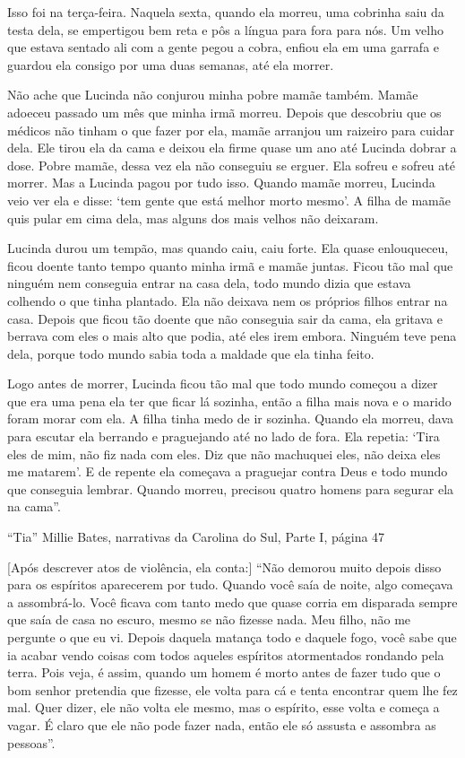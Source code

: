 Isso foi na terça-feira. Naquela sexta, quando ela morreu, uma cobrinha
saiu da testa dela, se empertigou bem reta e pôs a língua para fora para
nós. Um velho que estava sentado ali com a gente pegou a cobra, enfiou
ela em uma garrafa e guardou ela consigo por uma duas semanas, até ela
morrer.

Não ache que Lucinda não conjurou minha pobre mamãe também. Mamãe
adoeceu passado um mês que minha irmã morreu. Depois que descobriu que
os médicos não tinham o que fazer por ela, mamãe arranjou um raizeiro
para cuidar dela. Ele tirou ela da cama e deixou ela firme quase um ano
até Lucinda dobrar a dose. Pobre mamãe, dessa vez ela não conseguiu se
erguer. Ela sofreu e sofreu até morrer. Mas a Lucinda pagou por tudo
isso. Quando mamãe morreu, Lucinda veio ver ela e disse: `tem gente que
está melhor morto mesmo'. A filha de mamãe quis pular em cima dela, mas
alguns dos mais velhos não deixaram.

Lucinda durou um tempão, mas quando caiu, caiu forte. Ela quase
enlouqueceu, ficou doente tanto tempo quanto minha irmã e mamãe juntas.
Ficou tão mal que ninguém nem conseguia entrar na casa dela, todo mundo
dizia que estava colhendo o que tinha plantado. Ela não deixava nem os
próprios filhos entrar na casa. Depois que ficou tão doente que não
conseguia sair da cama, ela gritava e berrava com eles o mais alto que
podia, até eles irem embora. Ninguém teve pena dela, porque todo mundo
sabia toda a maldade que ela tinha feito.

Logo antes de morrer, Lucinda ficou tão mal que todo mundo começou a
dizer que era uma pena ela ter que ficar lá sozinha, então a filha mais
nova e o marido foram morar com ela. A filha tinha medo de ir sozinha.
Quando ela morreu, dava para escutar ela berrando e praguejando até no
lado de fora. Ela repetia: `Tira eles de mim, não fiz nada com eles. Diz
que não machuquei eles, não deixa eles me matarem'. E de repente ela
começava a praguejar contra Deus e todo mundo que conseguia lembrar.
Quando morreu, precisou quatro homens para segurar ela na cama''.

``Tia'' Millie Bates, narrativas da Carolina do Sul, Parte I, página 47

{[}Após descrever atos de violência, ela conta:{]} ``Não demorou muito
depois disso para os espíritos aparecerem por tudo. Quando você saía de
noite, algo começava a assombrá-lo. Você ficava com tanto medo que quase
corria em disparada sempre que saía de casa no escuro, mesmo se não
fizesse nada. Meu filho, não me pergunte o que eu vi. Depois daquela
matança todo e daquele fogo, você sabe que ia acabar vendo coisas com
todos aqueles espíritos atormentados rondando pela terra. Pois veja, é
assim, quando um homem é morto antes de fazer tudo que o bom senhor
pretendia que fizesse, ele volta para cá e tenta encontrar quem lhe fez
mal. Quer dizer, ele não volta ele mesmo, mas o espírito, esse volta e
começa a vagar. É claro que ele não pode fazer nada, então ele só
assusta e assombra as pessoas''.

